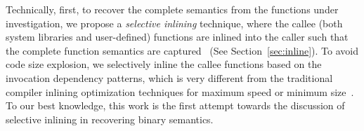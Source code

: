 Technically, first, to recover the  complete semantics from the functions under investigation, we propose a \emph{selective inlining} technique, where the callee (both system libraries and user-defined) functions are inlined into the caller such that the complete function semantics are captured~\cite{wang2015binary} (See Section~\ref{sec:inline}). %
To avoid code size explosion, we selectively inline the callee functions based on the invocation dependency patterns, which is very different from the traditional compiler inlining optimization techniques for maximum speed or minimum size~\cite{chang1992profile}.
To our best knowledge, this work is the first attempt towards the discussion of selective inlining in recovering binary semantics.
%



